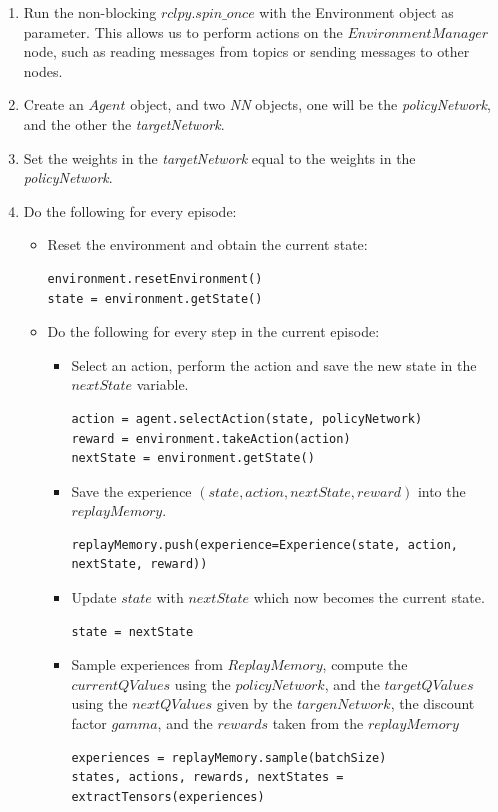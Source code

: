 \documentclass[12pt,oneside]{article}
\begin{document}
\begin{enumerate}
\item Run the non-blocking $rclpy.spin\_once$ with the Environment object as parameter. This allows us to perform actions on the $EnvironmentManager$ node, such as reading messages from topics or sending messages to other nodes.
\item Create an $Agent$ object, and two \textit{NN} objects, one will be the \textit{policyNetwork}, and the other the \textit{targetNetwork}.
\item Set the weights in the \textit{targetNetwork} equal to the weights in the \textit{policyNetwork}.
\item Do the following for every episode:
	\begin{itemize}
		\item Reset the environment and obtain the current state:
\begin{tcolorbox}[]
\begin{verbatim}
environment.resetEnvironment()
state = environment.getState()
\end{verbatim}
\end{tcolorbox}
		\item Do the following for every step in the current episode:
		\begin{itemize}
			\item Select an action, perform the action and save the new state in the $nextState$ variable.
\begin{tcolorbox}[]
\begin{verbatim}
action = agent.selectAction(state, policyNetwork)
reward = environment.takeAction(action)
nextState = environment.getState()
\end{verbatim}
\end{tcolorbox}
			\item Save the experience $(state, action, nextState, reward)$ into the $replayMemory$.
\begin{tcolorbox}[]
\begin{verbatim}
replayMemory.push(experience=Experience(state, action, nextState, reward))
\end{verbatim}
\end{tcolorbox}
			\item Update $state$ with $nextState$ which now becomes the current state.
\begin{tcolorbox}[]
\begin{verbatim}
state = nextState
\end{verbatim}
\end{tcolorbox}
			\item Sample experiences from $ReplayMemory$, compute the $currentQValues$ using the $policyNetwork$, and the $targetQValues$ using the $nextQValues$ given by the $targenNetwork$, the discount factor $gamma$, and the $rewards$ taken from the $replayMemory$
\begin{tcolorbox}[]
\begin{verbatim}
experiences = replayMemory.sample(batchSize)
states, actions, rewards, nextStates = extractTensors(experiences)


\end{verbatim}
\end{tcolorbox}
\end{itemize}
\end{itemize}
\end{enumerate}
\end{document}
